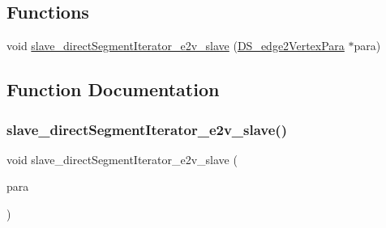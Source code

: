 \subsection*{Functions}
\begin{DoxyCompactItemize}
\item 
void \mbox{\hyperlink{test_2directSegment_2directSegmentIterator_8C_a6f37f216fc5e7f5e590bdf2a9175cd91}{slave\+\_\+direct\+Segment\+Iterator\+\_\+e2v\+\_\+slave}} (\mbox{\hyperlink{structDS__edge2VertexPara}{D\+S\+\_\+edge2\+Vertex\+Para}} $\ast$para)
\end{DoxyCompactItemize}


\subsection{Function Documentation}
\mbox{\label{test_2directSegment_2directSegmentIterator_8C_a6f37f216fc5e7f5e590bdf2a9175cd91}} 
\subsubsection{\texorpdfstring{slave\_directSegmentIterator\_e2v\_slave()}{slave\_directSegmentIterator\_e2v\_slave()}}
{\footnotesize\ttfamily void slave\+\_\+direct\+Segment\+Iterator\+\_\+e2v\+\_\+slave (\begin{DoxyParamCaption}\item[{\mbox{\hyperlink{structDS__edge2VertexPara}{D\+S\+\_\+edge2\+Vertex\+Para}} $\ast$}]{para }\end{DoxyParamCaption})}

